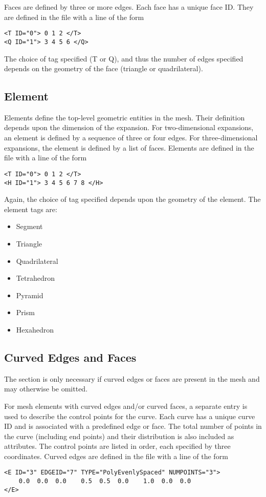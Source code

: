 Faces are defined by three or more edges. Each face has a unique face ID. They
are defined in the file with a line of the form
\begin{lstlisting}[style=XMLStyle]
<T ID="0"> 0 1 2 </T>
<Q ID="1"> 3 4 5 6 </Q>
\end{lstlisting}
The choice of tag specified (T or Q), and thus the number of edges specified depends on the geometry of the face (triangle or quadrilateral).


\subsection{Element}
Elements define the top-level geometric entities in the mesh. Their definition depends upon the dimension of the expansion. For two-dimensional expansions, an element is defined by a sequence of three or four edges. For three-dimensional expansions, the element is defined by a list of faces. Elements are defined in the file with a line of the form
\begin{lstlisting}[style=XMLStyle]
<T ID="0"> 0 1 2 </T>
<H ID="1"> 3 4 5 6 7 8 </H>
\end{lstlisting}
Again, the choice of tag specified depends upon the geometry of the element. The element tags are:

\begin{itemize}
    \item {} Segment
    \item {} Triangle
    \item {} Quadrilateral
    \item {} Tetrahedron
    \item {} Pyramid
    \item {} Prism
    \item {} Hexahedron
\end{itemize}


\subsection{Curved Edges and Faces}
\begin{tipbox}
    The  section is only necessary if curved edges or faces are
    present in the mesh and may otherwise be omitted.
\end{tipbox}

For mesh elements with curved edges and/or curved faces, a separate entry is used to describe the control points for the curve. Each curve has a unique curve ID and is associated with a predefined edge or face. The total number of points in the curve (including end points) and their distribution is also included as attributes. The control points are listed in order, each specified by three coordinates. Curved edges are defined in the file with a line of the form
\begin{lstlisting}[style=XMLStyle]
<E ID="3" EDGEID="7" TYPE="PolyEvenlySpaced" NUMPOINTS="3">
    0.0  0.0  0.0    0.5  0.5  0.0    1.0  0.0  0.0
</E>
\end{lstlisting}

